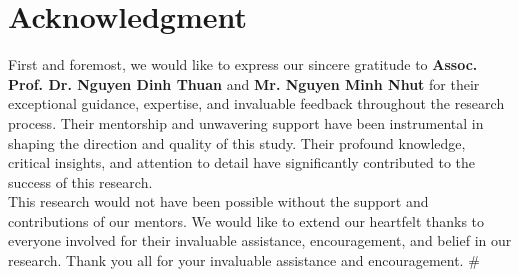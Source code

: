 \documentclass{ieeeojies}
\begin{document}
\section*{Acknowledgment}
First and foremost, we would like to express our sincere gratitude to \textbf{Assoc. Prof. Dr. Nguyen Dinh Thuan} and \textbf{Mr. Nguyen Minh Nhut} for their exceptional guidance, expertise, and invaluable feedback throughout the research process. Their mentorship and unwavering support have been instrumental in shaping the direction and quality of this study. Their profound knowledge, critical insights, and attention to detail have significantly contributed to the success of this research.
\\This research would not have been possible without the support and contributions of our mentors. We would like to extend our heartfelt thanks to everyone involved for their invaluable assistance, encouragement, and belief in our research. Thank you all for your invaluable assistance and encouragement.
# 
\end{document}
